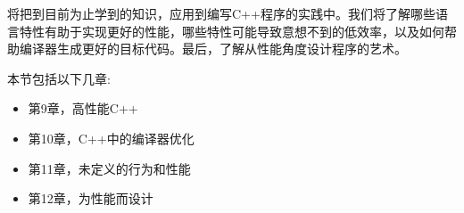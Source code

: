 
将把到目前为止学到的知识，应用到编写C++程序的实践中。我们将了解哪些语言特性有助于实现更好的性能，哪些特性可能导致意想不到的低效率，以及如何帮助编译器生成更好的目标代码。最后，了解从性能角度设计程序的艺术。

本节包括以下几章:

\begin{itemize}
\item 第9章，高性能C++
\item 第10章，C++中的编译器优化
\item 第11章，未定义的行为和性能
\item 第12章，为性能而设计
\end{itemize}

